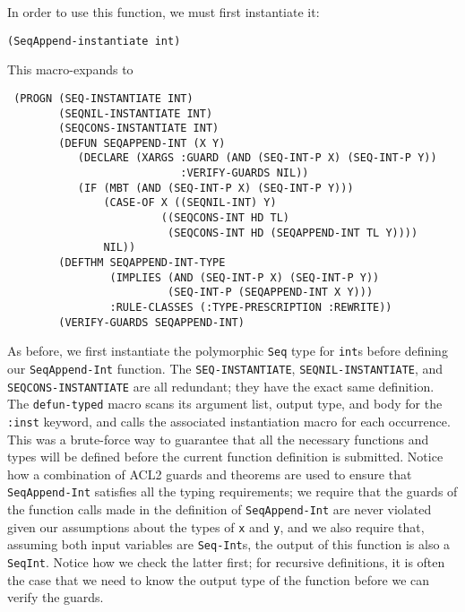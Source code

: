 \documentclass[]{eptcs}
\begin{document}
In order to use this function, we must first instantiate it:
\begin{verbatim}
(SeqAppend-instantiate int)
\end{verbatim}
This macro-expands to
\begin{verbatim}
 (PROGN (SEQ-INSTANTIATE INT)
        (SEQNIL-INSTANTIATE INT)
        (SEQCONS-INSTANTIATE INT)
        (DEFUN SEQAPPEND-INT (X Y)
           (DECLARE (XARGS :GUARD (AND (SEQ-INT-P X) (SEQ-INT-P Y))
                           :VERIFY-GUARDS NIL))
           (IF (MBT (AND (SEQ-INT-P X) (SEQ-INT-P Y)))
               (CASE-OF X ((SEQNIL-INT) Y)
                        ((SEQCONS-INT HD TL)
                         (SEQCONS-INT HD (SEQAPPEND-INT TL Y))))
               NIL))
        (DEFTHM SEQAPPEND-INT-TYPE
                (IMPLIES (AND (SEQ-INT-P X) (SEQ-INT-P Y))
                         (SEQ-INT-P (SEQAPPEND-INT X Y)))
                :RULE-CLASSES (:TYPE-PRESCRIPTION :REWRITE))
        (VERIFY-GUARDS SEQAPPEND-INT)
\end{verbatim}
As before, we first instantiate the polymorphic \verb|Seq| type for \verb|int|s before defining our \verb|SeqAppend-Int| function. The \verb|SEQ-INSTANTIATE|, \verb|SEQNIL-INSTANTIATE|, and \verb|SEQCONS-INSTANTIATE| are all redundant; they have the exact same definition. The \verb|defun-typed| macro scans its argument list, output type, and body for the \verb|:inst| keyword, and calls the associated instantiation macro for each occurrence. This was a brute-force way to guarantee that all the necessary functions and types will be defined before the current function definition is submitted. Notice how a combination of ACL2 guards and theorems are used to ensure that \verb|SeqAppend-Int| satisfies all the typing requirements; we require that the guards of the function calls made in the definition of \verb|SeqAppend-Int| are never violated given our assumptions about the types of \verb|x| and \verb|y|, and we also require that, assuming both input variables are \verb|Seq-Int|s, the output of this function is also a \verb|SeqInt|. Notice how we check the latter first; for recursive definitions, it is often the case that we need to know the output type of the function before we can verify the guards.
\end{document}
